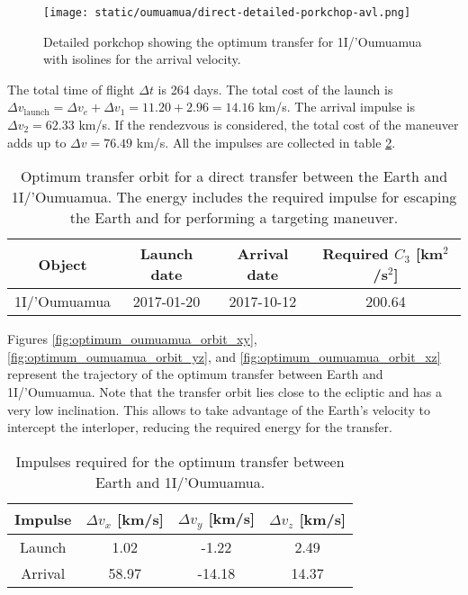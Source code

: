 \begin{figure}[H]
  \centering
  \texttt{[image: static/oumuamua/direct-detailed-porkchop-avl.png]}
  \caption[Detailed porkchop showing the optimum transfer for
    1I/'Oumuamua with the arrival velocity.]{Detailed porkchop showing the
    optimum transfer for 1I/'Oumuamua with isolines for the arrival
    velocity.}
  \label{fig:oumuamua-optimum-porkchop-avl}
\end{figure}

The total time of flight $\Delta t$ is 264 days. The total cost of the launch is
$\Delta v_\text{launch} = \Delta v_e + \Delta v_1 = 11.20 + 2.96 = 14.16$ km/s.
The arrival impulse is $\Delta v_2 = 62.33$ km/s. If the rendezvous is
considered, the total cost of the maneuver adds up to $\Delta v = 76.49$ km/s.
All the impulses are collected in table
\ref{tab:oumuamua-direct-transfer-impulses}.

\vspace{1cm}
\begin{table}[H]
  \centering
  \begin{tabular}{|c|c|c|c|}
    \hline
    Object       & Launch date & Arrival date & Required $C_3$ [km$^2$/s$^2$] \\
    \hline
    1I/'Oumuamua & 2017-01-20  & 2017-10-12   & 200.64                        \\
    \hline
  \end{tabular}
  \caption[Optimum transfer orbit for a direct transfer between the Earth and
    1I/'Oumuamua.]{Optimum transfer orbit for a direct transfer between the
    Earth and 1I/'Oumuamua. The energy includes the required impulse for
    escaping the Earth and for performing a targeting maneuver.}
  \label{tab:oumuamua-direct-transfer-optimum}
\end{table}

Figures \ref{fig:optimum_oumuamua_orbit_xy},
\ref{fig:optimum_oumuamua_orbit_yz}, and \ref{fig:optimum_oumuamua_orbit_xz}
represent the trajectory of the optimum transfer between Earth and 1I/'Oumuamua.
Note that the transfer orbit lies close to the ecliptic and has a very low
inclination. This allows to take advantage of the Earth's velocity to intercept
the interloper, reducing the required energy for the transfer.

\vspace{1cm}
\begin{table}[H]
  \centering
  \begin{tabular}{|c|c|c|c|}
    \hline
    Impulse & $\Delta v_x$ [km/s] & $\Delta v_y$ [km/s] & $\Delta v_z$ [km/s] \\
    \hline
    Launch  & 1.02                & -1.22               & 2.49                \\
    \hline
    Arrival & 58.97               & -14.18              & 14.37               \\
    \hline
  \end{tabular}
  \caption{Impulses required for the optimum transfer between Earth and 1I/'Oumuamua.}
  \label{tab:oumuamua-direct-transfer-impulses}
\end{table}

